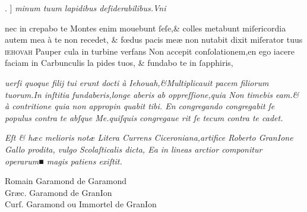 \documentclass{article}
\newcommand{\threecolumntypefacenames}[3]{\begin{multicols}{3}
		\tiny
		\hfill \qquad \qquad \qquad \qquad #1\hspace*{\fill}\\
		\columnbreak
		\hfill #2\hspace*{\fill}\\
		\columnbreak
		\hfill #3\qquad \qquad \qquad \qquad \hspace*{\fill}
\end{multicols}}
\begin{document}
		{\grecs {}\selectfont{} \scalebox{0.5}{}\kern-2pt\scalebox{1.2}{}.} ] \textit{minum tuum lapidibus deſiderabilibus.Vni\linebreak}
\vspace{-2.55\baselineskip}
\begin{multicols}{2}
	\fontsize{7}{8}\selectfont
	\justifying
	\noindent nec in crepabo te Montes enim mouebunt ſeſe,\& colles metabunt miſericordia autem mea\linebreak
	\`a te non recedet, \& f\oe{}dus pacis me\ae{} non nutabit dixit miſerator tuus \textsc{ iehovah} Pauper\linebreak
	cula in turbine verfans Non accepit conſolationem,en ego iacere faciam in Carbunculis la\linebreak
	pides tuos, \& fundabo te in ſapphiris,

	\columnbreak
	\justifying
	\noindent
	\textit{uerſi quoque filij tui erunt docti \`a Iehouah,\&Multiplicauit pacem filiorum tuorum.In inſtitia\linebreak
	fundaberis,longe aberis ab oppreſſione,quia Non timebis eam.\& \`a contritione quia non appropin\linebreak
	quabit tibi. {E}n congregando congregabit ſe populus contra te abſque {M}e.quiſquis congregaue\linebreak
	rit ſe tecum contra te cadet.}
\end{multicols}
\vspace{-1\baselineskip}
\raggedright
\noindent{}  \normalsize {\large \scalebox{0.7}{☞}} \fontsize{6}{7}\selectfont\textit{Eſt \& h\ae{}c melioris not\ae{} Litera Currens Ciceroniana,artifice Roberto GranIone Gallo prodita, vulgo Scolaſticalis dicta, Ea in lineas arctior componitur operarum■ magis patiens exiſtit.}
\vspace{-1.5\baselineskip}
\threecolumntypefacenames{Romain Garamond de Garamond}{Gr\ae{}c. Garamond de GranIon}{Curſ. Garamond ou Immortel de GranIon}
\end{document}
